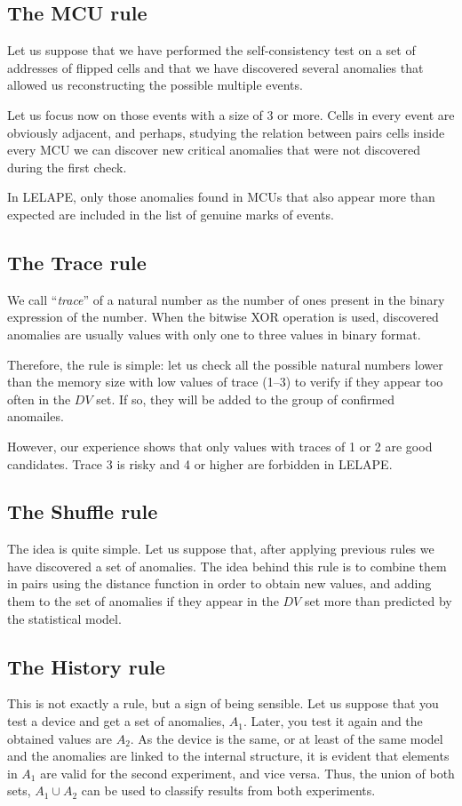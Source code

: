 \subsection{The MCU rule}
%
Let us suppose that we have performed the self-consistency test on a set of addresses of flipped cells and that we have discovered several anomalies that allowed us reconstructing the possible multiple events. 

Let us focus now on those events with a size of 3 or more. Cells in every event are obviously adjacent, and perhaps, studying the relation between pairs cells inside every MCU we can discover new critical anomalies that were not discovered during the first check.

In LELAPE, only those anomalies found in MCUs that also appear more than expected are included in the list of genuine marks of events.
%
\subsection{The Trace rule}
% 
We call ``\textit{trace}'' of a natural number as the number of ones present in the binary expression of the number. When the bitwise XOR operation is used, discovered anomalies are usually values with only one to three values in binary format. 

Therefore, the rule is simple: let us check all the possible natural numbers lower than the memory size with low values of trace (1--3) to verify if they appear too often in the \(DV\) set. If so, they will be added to the group of confirmed anomailes. 

However, our experience shows that only values with traces of 1 or 2 are good candidates. Trace 3 is risky and 4 or higher are forbidden in LELAPE.
%
\subsection{The Shuffle rule}
%
The idea is quite simple. Let us suppose that, after applying previous rules we have discovered a set of anomalies. The idea behind this rule is to combine them in pairs using the distance function in order to obtain new values, and adding them to the set of anomalies if they appear in the \(DV\) set more than predicted by the statistical model.
%
\subsection{The History rule}
%
This is not exactly a rule, but a sign of being sensible. Let us suppose that you test a device and get a set of anomalies, \(A_1\). Later, you test it again and the obtained values are \(A_2\). As the device is the same, or at least of the same model and the anomalies are linked to the internal structure, it is evident that elements in \(A_1\) are valid for the second experiment, and vice versa. Thus, the union of both sets, \(A_1 \cup A_2\) can be used to classify results from both experiments.

